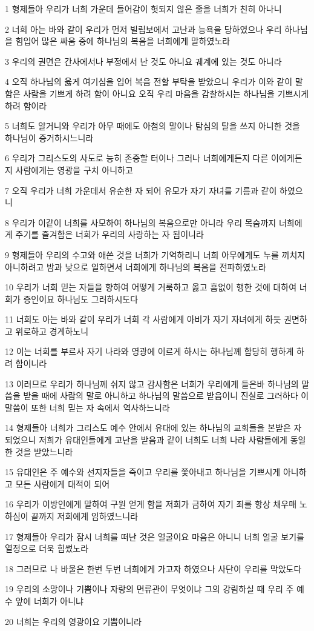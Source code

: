 \par 1 형제들아 우리가 너희 가운데 들어감이 헛되지 않은 줄을 너희가 친히 아나니
\par 2 너희 아는 바와 같이 우리가 먼저 빌립보에서 고난과 능욕을 당하였으나 우리 하나님을 힘입어 많은 싸움 중에 하나님의 복음을 너희에게 말하였노라
\par 3 우리의 권면은 간사에서나 부정에서 난 것도 아니요 궤계에 있는 것도 아니라
\par 4 오직 하나님의 옳게 여기심을 입어 복음 전할 부탁을 받았으니 우리가 이와 같이 말함은 사람을 기쁘게 하려 함이 아니요 오직 우리 마음을 감찰하시는 하나님을 기쁘시게 하려 함이라
\par 5 너희도 알거니와 우리가 아무 때에도 아첨의 말이나 탐심의 탈을 쓰지 아니한 것을 하나님이 증거하시느니라
\par 6 우리가 그리스도의 사도로 능히 존중할 터이나 그러나 너희에게든지 다른 이에게든지 사람에게는 영광을 구치 아니하고
\par 7 오직 우리가 너희 가운데서 유순한 자 되어 유모가 자기 자녀를 기름과 같이 하였으니
\par 8 우리가 이같이 너희를 사모하여 하나님의 복음으로만 아니라 우리 목숨까지 너희에게 주기를 즐겨함은 너희가 우리의 사랑하는 자 됨이니라
\par 9 형제들아 우리의 수고와 애쓴 것을 너희가 기억하리니 너희 아무에게도 누를 끼치지 아니하려고 밤과 낮으로 일하면서 너희에게 하나님의 복음을 전파하였노라
\par 10 우리가 너희 믿는 자들을 향하여 어떻게 거룩하고 옳고 흠없이 행한 것에 대하여 너희가 증인이요 하나님도 그러하시도다
\par 11 너희도 아는 바와 같이 우리가 너희 각 사람에게 아비가 자기 자녀에게 하듯 권면하고 위로하고 경계하노니
\par 12 이는 너희를 부르사 자기 나라와 영광에 이르게 하시는 하나님께 합당히 행하게 하려 함이니라
\par 13 이러므로 우리가 하나님께 쉬지 않고 감사함은 너희가 우리에게 들은바 하나님의 말씀을 받을 때에 사람의 말로 아니하고 하나님의 말씀으로 받음이니 진실로 그러하다 이 말씀이 또한 너희 믿는 자 속에서 역사하느니라
\par 14 형제들아 너희가 그리스도 예수 안에서 유대에 있는 하나님의 교회들을 본받은 자 되었으니 저희가 유대인들에게 고난을 받음과 같이 너희도 너희 나라 사람들에게 동일한 것을 받았느니라
\par 15 유대인은 주 예수와 선지자들을 죽이고 우리를 쫓아내고 하나님을 기쁘시게 아니하고 모든 사람에게 대적이 되어
\par 16 우리가 이방인에게 말하여 구원 얻게 함을 저희가 금하여 자기 죄를 항상 채우매 노하심이 끝까지 저희에게 임하였느니라
\par 17 형제들아 우리가 잠시 너희를 떠난 것은 얼굴이요 마음은 아니니 너희 얼굴 보기를 열정으로 더욱 힘썼노라
\par 18 그러므로 나 바울은 한번 두번 너희에게 가고자 하였으나 사단이 우리를 막았도다
\par 19 우리의 소망이나 기쁨이나 자랑의 면류관이 무엇이냐 그의 강림하실 때 우리 주 예수 앞에 너희가 아니냐
\par 20 너희는 우리의 영광이요 기쁨이니라

